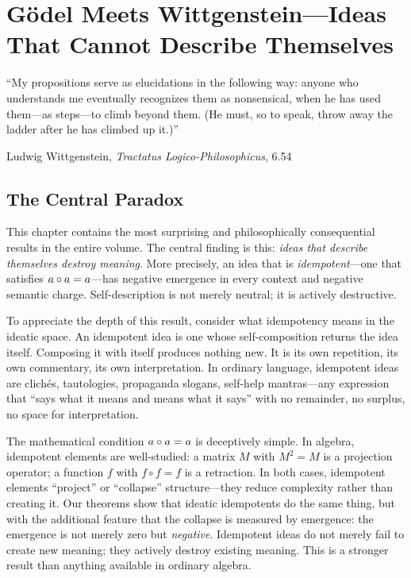 
\chapter{Gödel Meets Wittgenstein---Ideas That Cannot Describe Themselves}
\label{ch:godel-wittgenstein}

\epigraph{``My propositions serve as elucidations in the following way:
anyone who understands me eventually recognizes them as nonsensical,
when he has used them---as steps---to climb beyond them. (He must, so
to speak, throw away the ladder after he has climbed up it.)''}
{Ludwig Wittgenstein, \textit{Tractatus Logico-Philosophicus}, 6.54}

\section{The Central Paradox}

This chapter contains the most surprising and philosophically consequential
results in the entire volume. The central finding is this: \emph{ideas that
describe themselves destroy meaning}. More precisely, an idea that is
\emph{idempotent}---one that satisfies $a \circ a = a$---has negative
emergence in every context and negative semantic charge. Self-description
is not merely neutral; it is actively destructive.

To appreciate the depth of this result, consider what idempotency means
in the ideatic space. An idempotent idea is one whose self-composition
returns the idea itself. Composing it with itself produces nothing new.
It is its own repetition, its own commentary, its own interpretation.
In ordinary language, idempotent ideas are clich\'es, tautologies,
propaganda slogans, self-help mantras---any expression that ``says what
it means and means what it says'' with no remainder, no surplus, no
space for interpretation.

The mathematical condition $a \circ a = a$ is deceptively simple.
In algebra, idempotent elements are well-studied: a matrix $M$ with
$M^2 = M$ is a projection operator; a function $f$ with $f \circ f = f$
is a retraction. In both cases, idempotent elements ``project'' or
``collapse'' structure---they reduce complexity rather than creating it.
Our theorems show that ideatic idempotents do the same thing, but with
the additional feature that the collapse is measured by emergence:
the emergence is not merely zero but \emph{negative}. Idempotent ideas
do not merely fail to create new meaning; they actively destroy existing
meaning. This is a stronger result than anything available in ordinary
algebra.


